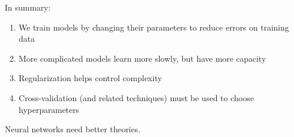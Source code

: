 In summary:
\vspace{1cm}
\pause{}
\begin{enumerate}
	\item We train models by changing their parameters to reduce errors on training data \pause{}
	\item More complicated models learn more slowly, but have more capacity\pause{}
	\item Regularization helps control complexity\pause{}
	\item Cross-validation (and related techniques)  must be used to choose hyperparameters\pause{}
\end{enumerate}
\vspace{1cm}
Neural networks need better theories.